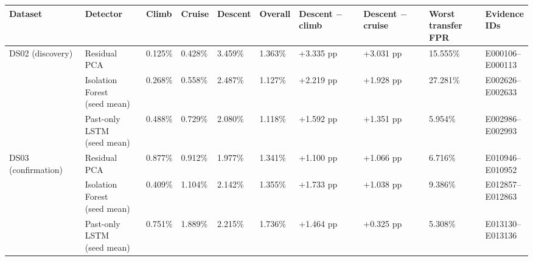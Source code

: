 \begin{tabular}{llllllllll}
\toprule
Dataset & Detector & Climb & Cruise & Descent & Overall & \makecell{Descent\\$-$ climb} & \makecell{Descent\\$-$ cruise} & \makecell{Worst\\transfer FPR} & \makecell{Evidence\\IDs} \\
\midrule
DS02 (discovery) & Residual PCA & 0.125\% & 0.428\% & 3.459\% & 1.363\% & +3.335 pp & +3.031 pp & 15.555\% & \makecell{E000106--\\E000113} \\
 & \makecell{Isolation Forest\\(seed mean)} & 0.268\% & 0.558\% & 2.487\% & 1.127\% & +2.219 pp & +1.928 pp & 27.281\% & \makecell{E002626--\\E002633} \\
 & \makecell{Past-only LSTM\\(seed mean)} & 0.488\% & 0.729\% & 2.080\% & 1.118\% & +1.592 pp & +1.351 pp & 5.954\% & \makecell{E002986--\\E002993} \\
\midrule
DS03 (confirmation) & Residual PCA & 0.877\% & 0.912\% & 1.977\% & 1.341\% & +1.100 pp & +1.066 pp & 6.716\% & \makecell{E010946--\\E010952} \\
 & \makecell{Isolation Forest\\(seed mean)} & 0.409\% & 1.104\% & 2.142\% & 1.355\% & +1.733 pp & +1.038 pp & 9.386\% & \makecell{E012857--\\E012863} \\
 & \makecell{Past-only LSTM\\(seed mean)} & 0.751\% & 1.889\% & 2.215\% & 1.736\% & +1.464 pp & +0.325 pp & 5.308\% & \makecell{E013130--\\E013136} \\
\bottomrule
\end{tabular}
